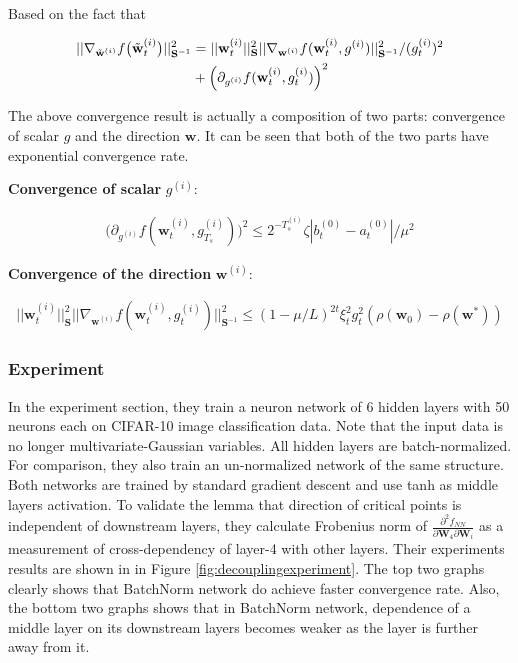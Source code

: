 \documentclass{article}
\begin{document}
Based on the fact that

\begin{align*}
    ||\nabla_{\Tilde{\textbf{w}}^{(i)}}f\big(\Tilde{\textbf{w}}_t^{(i)}\big)||^2_{\textbf{S}^{-1}} &= ||\textbf{w}_t^{(i)}||^2_{\textbf{S}}||\nabla_{\textbf{w}^{(i)}}f(\textbf{w}_t^{(i)},g^{(i)})||^2_{\textbf{S}^{-1}}/(g_t^{(i)})^2\\
    &+\Big(\partial_{g^{(i)}}f(\textbf{w}_t^{(i)},g^{(i)}_{t})\Big)^2
\end{align*}

The above convergence result is actually a composition of two parts: convergence of scalar $g$ and the direction $\textbf{w}$. It can be seen that both of the two parts have exponential convergence rate.

\textbf{Convergence of scalar} $g^{(i)}$:

\begin{align*}
    \Big(\partial_{g^{(i)}}f(\textbf{w}_t^{(i)},g^{(i)}_{T_s})\Big)^2\leq2^{-T_s^{(i)}}\zeta|b_t^{(0)}-a_t^{(0)}|/\mu^2
\end{align*}

\textbf{Convergence of the direction} $\textbf{w}^{(i)}$:

\begin{align*}
    ||\textbf{w}_t^{(i)}||^2_{\textbf{S}}||\nabla_{\textbf{w}^{(i)}}f(\textbf{w}_t^{(i)},g_t^{(i)})||^2_{\textbf{S}^{-1}}\leq (1-\mu/L)^{2t}\xi_t^{2}g_t^{2}(\rho(\textbf{w}_0)-\rho(\textbf{w}^*))
\end{align*}

\subsubsection{Experiment}

In the experiment section, they train a neuron network of 6 hidden layers with 50 neurons each on CIFAR-10 image classification data. Note that the input data is no longer multivariate-Gaussian variables. All hidden layers are batch-normalized. For comparison, they also train an un-normalized network of the same structure. Both networks are trained by standard gradient descent and use tanh as middle layers activation. To validate the lemma that direction of critical points is independent of downstream layers, they calculate Frobenius norm of $\frac{\partial^2f_{NN}}{\partial\textbf{W}_4\partial\textbf{W}_i}$ as a measurement of cross-dependency of layer-4 with other layers. Their experiments results are shown in in Figure \ref{fig:decouplingexperiment}. The top two graphs clearly shows that BatchNorm network do achieve faster convergence rate. Also, the bottom two graphs shows that in BatchNorm network, dependence of a middle layer on its downstream layers becomes weaker as the layer is further away from it.
\end{document}
